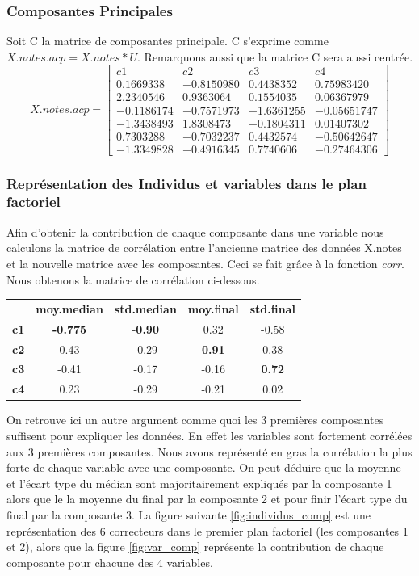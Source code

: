 \documentclass[10pt]{article}
\begin{document}
	\subsubsection{Composantes Principales}
	Soit C la matrice  de composantes principale. C s'exprime comme $X.notes.acp = X.notes * U$. Remarquons aussi que la matrice C sera aussi centrée.
	\[
	X.notes.acp=
	\begin{bmatrix}
	c1	& c2	& c3 &	c4\\
	0.1669338 &	-0.8150980	& 0.4438352	& 0.75983420\\
	2.2340546	& 0.9363064	& 0.1554035	& 0.06367979\\
	-0.1186174 &	-0.7571973	& -1.6361255	& -0.05651747\\
	-1.3438493 &	1.8308473 &	-0.1804311 &	0.01407302\\
	0.7303288 &	-0.7032237 &	0.4432574 &	-0.50642647\\
	-1.3349828	& -0.4916345 &	0.7740606 &	-0.27464306
	\end{bmatrix}
	\]
	
	\subsubsection{Représentation des Individus  et variables dans le plan factoriel}
	Afin d'obtenir la contribution de chaque composante dans une variable nous calculons la matrice de corrélation entre l'ancienne matrice des données X.notes et la nouvelle matrice avec les composantes. Ceci se fait grâce à la fonction \textit{corr}. Nous obtenons la matrice de corrélation ci-dessous.\\
	\begin{center}
		\begin{tabular}{c c c c c}
			&	\textbf{moy.median}	&	 \textbf{std.median} &		\textbf{moy.final}	&	\textbf{ std.final}\\
			\textbf{c1}	&	\textbf{-0.775} &		-\textbf{0.90}	&	0.32	&	-0.58\\
			\textbf{c2}	&	0.43 &		-0.29	&\textbf{	0.91}	&	0.38\\
			\textbf{c3}	&	-0.41	&	-0.17	&	-0.16	&	\textbf{0.72}\\
			\textbf{c4}	&	0.23 &		-0.29 &		-0.21	&	0.02
		\end{tabular}
	\end{center}
	On retrouve ici un autre argument comme quoi les 3 premières composantes suffisent pour expliquer les données. En effet les variables sont fortement corrélées aux 3 premières composantes. Nous avons représenté en gras la corrélation la plus forte de chaque variable avec une composante. On peut déduire que la moyenne et l'écart type du médian sont majoritairement expliqués par la composante 1 alors que le la moyenne du final par la composante 2 et pour finir l'écart type du final par la composante 3. La figure suivante \ref{fig:individus_comp}	est une représentation des 6 correcteurs dans le premier plan factoriel (les composantes 1 et 2), alors que la figure \ref{fig:var_comp} représente la contribution de chaque composante pour chacune des 4 variables.\\
	
\end{document}

